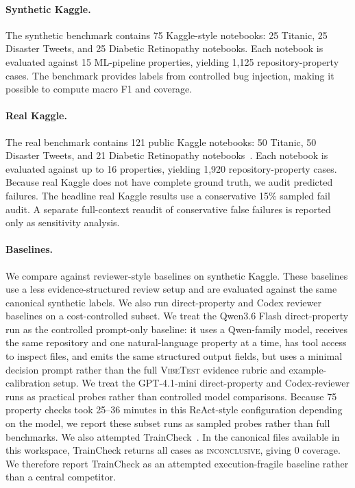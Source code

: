 \documentclass[11pt]{article}
\newcommand{\inconclusive}{\textsc{inconclusive}}
\newcommand{\vibetest}{\textsc{VibeTest}}
\begin{document}
\paragraph{Synthetic Kaggle.}
The synthetic benchmark contains 75 Kaggle-style notebooks: 25 Titanic, 25 Disaster Tweets, and 25 Diabetic Retinopathy notebooks.
Each notebook is evaluated against 15 ML-pipeline properties, yielding 1,125 repository-property cases.
The benchmark provides labels from controlled bug injection, making it possible to compute macro F1 and coverage.

\paragraph{Real Kaggle.}
The real benchmark contains 121 public Kaggle notebooks: 50 Titanic, 50 Disaster Tweets, and 21 Diabetic Retinopathy notebooks~\citep{kaggle_titanic,kaggle_disaster_tweets,kaggle_diabetic_retinopathy}.
Each notebook is evaluated against up to 16 properties, yielding 1,920 repository-property cases.
Because real Kaggle does not have complete ground truth, we audit predicted failures.
The headline real Kaggle results use a conservative 15\% sampled fail audit.
A separate full-context reaudit of conservative false failures is reported only as sensitivity analysis.

\paragraph{Baselines.}
We compare against reviewer-style baselines on synthetic Kaggle.
These baselines use a less evidence-structured review setup and are evaluated against the same canonical synthetic labels.
We also run direct-property and Codex reviewer baselines on a cost-controlled subset.
We treat the Qwen3.6 Flash direct-property run as the controlled prompt-only baseline: it uses a Qwen-family model, receives the same repository and one natural-language property at a time, has tool access to inspect files, and emits the same structured output fields, but uses a minimal decision prompt rather than the full \vibetest{} evidence rubric and example-calibration setup.
We treat the GPT-4.1-mini direct-property and Codex-reviewer runs as practical probes rather than controlled model comparisons.
Because 75 property checks took 25--36 minutes in this ReAct-style configuration depending on the model, we report these subset runs as sampled probes rather than full benchmarks.
We also attempted TrainCheck~\citep{traincheck}.
In the canonical files available in this workspace, TrainCheck returns all cases as \inconclusive, giving 0 coverage.
We therefore report TrainCheck as an attempted execution-fragile baseline rather than a central competitor.
\end{document}
